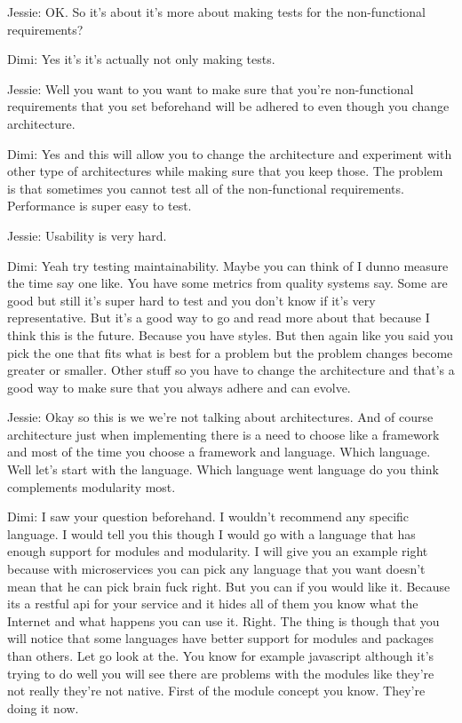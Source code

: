 Jessie: OK. So it's about it's more about making tests for the non-functional requirements?

Dimi: Yes it's it's actually not only making tests.

Jessie: Well you want to you want to make sure that you're non-functional requirements that you set beforehand will be adhered to even though you change architecture.

Dimi: Yes and this will allow you to change the architecture and experiment with other type of architectures while making sure that you keep those. The problem is that sometimes you cannot test all of the non-functional requirements. Performance is super easy to test.

Jessie: Usability is very hard.

Dimi: Yeah try testing maintainability. Maybe you can think of I dunno measure the time say one like. You have some metrics from quality systems say. Some are good but still it's super hard to test and you don't know if it's very representative. But it's a good way to go and read more about that because I think this is the future. Because you have styles. But then again like you said you pick the one that fits what is best for a problem but the problem changes become greater or smaller. Other stuff so you have to change the architecture and that's a good way to make sure that you always adhere and can evolve.

Jessie: Okay so this is we we're not talking about architectures. And of course architecture just when implementing there is a need to choose like a framework and most of the time you choose a framework and language. Which language. Well let's start with the language. Which language went language do you think complements modularity most.

Dimi: I saw your question beforehand. I wouldn't recommend any specific language. I would tell you this though I would go with a language that has enough support for modules and modularity. I will give you an example right because with microservices you can pick any language that you want doesn't mean that he can pick brain fuck right. But you can if you would like it. Because its a restful api for your service and it hides all of them you know what the Internet and what happens you can use it. Right. The thing is though that you will notice that some languages have better support for modules and packages than others. Let go look at the. You know for example javascript although it's trying to do well you will see there are problems with the modules like they're not really they're not native. First of the module concept you know. They're doing it now.

